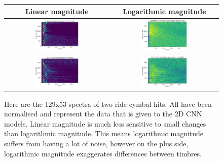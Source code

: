 \documentclass[12pt]{article}
\begin{document}
    \begin{figure}[H]
        \centering
        \begin{tabular}{c|c}
            Linear magnitude & Logarithmic magnitude \\
            \hline
            \includegraphics[width=0.45\textwidth]{figures/linear_spectrogram_ride_normal.png}&
            \includegraphics[width=0.45\textwidth]{figures/log_spectrogram_ride_normal.png}\\
            \includegraphics[width=0.45\textwidth]{figures/linear_spectrogram_ride_bell.png}&
            \includegraphics[width=0.45\textwidth]{figures/log_spectrogram_ride_bell.png}
        \end{tabular}
        \caption{\footnotesize{Here are the 129x53 spectra of two ride cymbal hits. All have been normalised and represent the data that is given to the 2D CNN models. Linear magnitude is much less sensitive to small changes than logarithmic magnitude. This means logarithmic magnitude suffers from having a lot of noise, however on the plus side, logarithmic magnitude exaggerates differences between timbres.}}
        \label{fig:spectrograms}
    \end{figure}
    
\end{document}
